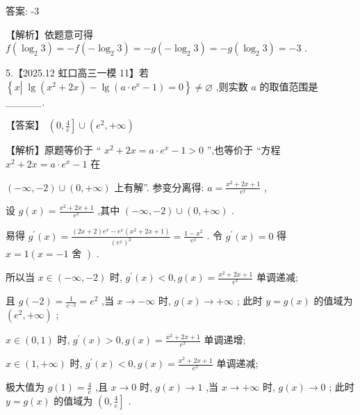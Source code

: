 \documentclass[10pt]{article}
\begin{document}
答案: -3

【解析】依题意可得 \(f\left( {{\log }_{2}3}\right)  =  - f\left( {-{\log }_{2}3}\right)  =  - g\left( {-{\log }_{2}3}\right)  =  - g\left( {{\log }_{2}3}\right)  =  - 3\) .

5.【2025.12 虹口高三一模 11】若 \(\left\{  {x\left| {\;\lg \left( {{x}^{2} + {2x}}\right)  - \lg \left( {a \cdot  {\mathrm{e}}^{x} - 1}\right)  = 0}\right. }\right\}   \neq  \varnothing\) ,则实数 \(a\) 的取值范围是\_\_\_\_\_.

【答案】 \(\left( {0,\frac{4}{e}}\right\rbrack   \cup  \left( {{e}^{2}, + \infty }\right)\)

【解析】原题等价于 “ \({x}^{2} + {2x} = a \cdot  {e}^{x} - 1 > 0\) ”,也等价于 “方程 \({x}^{2} + {2x} = a \cdot  {e}^{x} - 1\) 在

\(\left( {-\infty , - 2}\right)  \cup  \left( {0, + \infty }\right)\) 上有解”. 参变分离得: \(a = \frac{{x}^{2} + {2x} + 1}{{e}^{x}}\) ,

设 \(g\left( x\right)  = \frac{{x}^{2} + {2x} + 1}{{e}^{x}}\) ,其中 \(\left( {-\infty , - 2}\right)  \cup  \left( {0, + \infty }\right)\) .

易得 \({g}^{\prime }\left( x\right)  = \frac{\left( {{2x} + 2}\right) {e}^{x} - {e}^{x}\left( {{x}^{2} + {2x} + 1}\right) }{{\left( {e}^{x}\right) }^{2}} = \frac{1 - {x}^{2}}{{e}^{x}}\) . 令 \({g}^{\prime }\left( x\right)  = 0\) 得 \(x = 1\left( {x =  - 1\text{ 舍 }}\right)\) .

所以当 \(x \in  \left( {-\infty , - 2}\right)\) 时, \({g}^{\prime }\left( x\right)  < 0,g\left( x\right)  = \frac{{x}^{2} + {2x} + 1}{{e}^{x}}\) 单调递减;

且 \(g\left( {-2}\right)  = \frac{1}{{e}^{-2}} = {e}^{2}\) ,当 \(x \rightarrow   - \infty\) 时, \(g\left( x\right)  \rightarrow   + \infty\) ; 此时 \(y = g\left( x\right)\) 的值域为 \(\left( {{e}^{2}, + \infty }\right)\) ;

\(x \in  \left( {0,1}\right)\) 时, \({g}^{\prime }\left( x\right)  > 0,g\left( x\right)  = \frac{{x}^{2} + {2x} + 1}{{e}^{x}}\) 单调递增;

\(x \in  \left( {1, + \infty }\right)\) 时, \({g}^{\prime }\left( x\right)  < 0,g\left( x\right)  = \frac{{x}^{2} + {2x} + 1}{{e}^{x}}\) 单调递减;

极大值为 \(g\left( 1\right)  = \frac{4}{e}\) ,且 \(x \rightarrow  0\) 时, \(g\left( x\right)  \rightarrow  1\) ,当 \(x \rightarrow   + \infty\) 时, \(g\left( x\right)  \rightarrow  0\) ; 此时 \(y = g\left( x\right)\) 的值域为 \(\left( {0,\frac{4}{e}}\right\rbrack\) .
\end{document}
